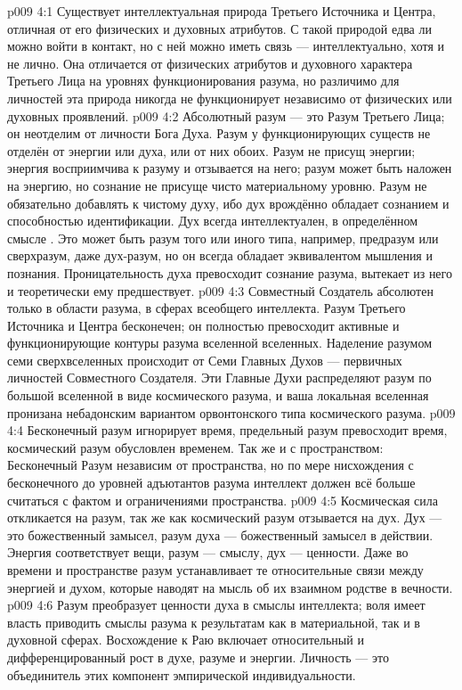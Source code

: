 \vs p009 4:1 Существует интеллектуальная природа Третьего Источника и Центра, отличная от его физических и духовных атрибутов. С такой природой едва ли можно войти в контакт, но с ней можно иметь связь --- интеллектуально, хотя и не лично. Она отличается от физических атрибутов и духовного характера Третьего Лица на уровнях функционирования разума, но различимо для личностей эта природа никогда не функционирует независимо от физических или духовных проявлений.
\vs p009 4:2 Абсолютный разум --- это Разум Третьего Лица; он неотделим от личности Бога Духа. Разум у функционирующих существ не отделён от энергии или духа, или от них обоих. Разум не присущ энергии; энергия восприимчива к разуму и отзывается на него; разум может быть наложен на энергию, но сознание не присуще чисто материальному уровню. Разум не обязательно добавлять к чистому духу, ибо дух врождённо обладает сознанием и способностью идентификации. Дух всегда интеллектуален, в определённом смысле . Это может быть разум того или иного типа, например, предразум или сверхразум, даже дух\hyp{}разум, но он всегда обладает эквивалентом мышления и познания. Проницательность духа превосходит сознание разума, вытекает из него и теоретически ему предшествует.
\vs p009 4:3 \pc Совместный Создатель абсолютен только в области разума, в сферах всеобщего интеллекта. Разум Третьего Источника и Центра бесконечен; он полностью превосходит активные и функционирующие контуры разума вселенной вселенных. Наделение разумом семи сверхвселенных происходит от Семи Главных Духов --- первичных личностей Совместного Создателя. Эти Главные Духи распределяют разум по большой вселенной в виде космического разума, и ваша локальная вселенная пронизана небадонским вариантом орвонтонского типа космического разума.
\vs p009 4:4 Бесконечный разум игнорирует время, предельный разум превосходит время, космический разум обусловлен временем. Так же и с пространством: Бесконечный Разум независим от пространства, но по мере нисхождения с бесконечного до уровней адъютантов разума интеллект должен всё больше считаться с фактом и ограничениями пространства.
\vs p009 4:5 \pc Космическая сила откликается на разум, так же как космический разум отзывается на дух. Дух --- это божественный замысел, разум духа --- божественный замысел в действии. Энергия соответствует вещи, разум --- смыслу, дух --- ценности. Даже во времени и пространстве разум устанавливает те относительные связи между энергией и духом, которые наводят на мысль об их взаимном родстве в вечности.
\vs p009 4:6 Разум преобразует ценности духа в смыслы интеллекта; воля имеет власть приводить смыслы разума к результатам как в материальной, так и в духовной сферах. Восхождение к Раю включает относительный и дифференцированный рост в духе, разуме и энергии. Личность --- это объединитель этих компонент эмпирической индивидуальности.
